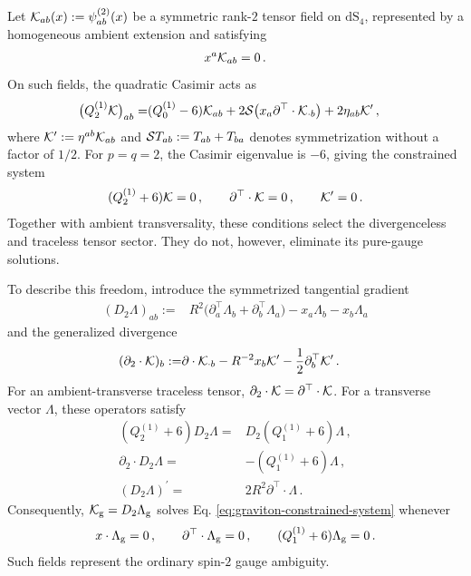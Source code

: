 \documentclass{SciPost}
\begin{document}
Let ${\cal K}_{ab}(x):=\psi^{(2)}_{ab}(x)$ be a symmetric rank-$2$ tensor field on $\mathrm{dS}_{4}$, represented by a homogeneous ambient extension and satisfying
\begin{align}
    x^a{\cal K}_{ab}=0 \,.
\end{align}
On such fields, the quadratic Casimir acts as
\begin{align}
    \bigl(Q^{(1)}_2{\cal K}\bigr)_{ab}
    =&
    (Q^{(1)}_0-6){\cal K}_{ab}
    +2{\cal S}\bigl(x_a\partial^{\top}\cdot{\cal K}_{\cdot b}\bigr)
    +2\eta_{ab}{\cal K}^{\prime} \,,
\end{align}
where ${\cal K}^{\prime}:=\eta^{ab}{\cal K}_{ab}$ and ${\cal S}T_{ab}:=T_{ab}+T_{ba}$ denotes symmetrization without a factor of $1/2$. For $p=q=2$, the Casimir eigenvalue is $-6$, giving the
constrained system
\begin{align}\label{eq:graviton-constrained-system}
    (Q^{(1)}_2+6){\cal K}=0 \,,
    \qquad
    \partial^{\top}\cdot{\cal K}=0 \,,
    \qquad
    {\cal K}^{\prime}=0 \,.
\end{align}
Together with ambient transversality, these conditions select the divergenceless and traceless tensor sector. They do not, however, eliminate its pure-gauge solutions.

To describe this freedom, introduce the symmetrized tangential gradient
\begin{align}
    (D_2\Lambda)_{ab}
    :=&
    R^2\bigl(
        \partial^{\top}_a\Lambda_b
        +\partial^{\top}_b\Lambda_a
    \bigr)
    -x_a\Lambda_b-x_b\Lambda_a
\end{align}
and the generalized divergence
\begin{align}
    (\partial_2\cdot{\cal K})_b
    :=&
    \partial\cdot{\cal K}_{\cdot b}
    -R^{-2}x_b{\cal K}^{\prime}
    -\frac12\partial^{\top}_b{\cal K}^{\prime} \,.
\end{align}
For an ambient-transverse traceless tensor, $\partial_2\cdot{\cal K}=\partial^{\top}\cdot{\cal K}$. For a transverse vector $\Lambda$, these operators satisfy 
\begin{align}\label{eq:graviton-gauge-identities}
    (Q^{(1)}_2+6)D_2\Lambda
    =&D_2(Q^{(1)}_1+6)\Lambda \,,
     \\[3pt]
    \partial_2\cdot D_2\Lambda
    =&-(Q^{(1)}_1+6)\Lambda \,,
     \\[3pt]
    (D_2\Lambda)^{\prime}
    =&2R^2\partial^{\top}\cdot\Lambda \,.
\end{align}
Consequently, ${\cal K}_{\rm g}=D_2\Lambda_{\rm g}$ solves Eq. \eqref{eq:graviton-constrained-system} whenever
\begin{align}
    x\cdot\Lambda_{\rm g}=0 \,,
    \qquad
    \partial^{\top}\cdot\Lambda_{\rm g}=0 \,,
    \qquad
    (Q^{(1)}_1+6)\Lambda_{\rm g}=0 \,.
\end{align}
Such fields represent the ordinary spin-$2$ gauge ambiguity.
\end{document}
